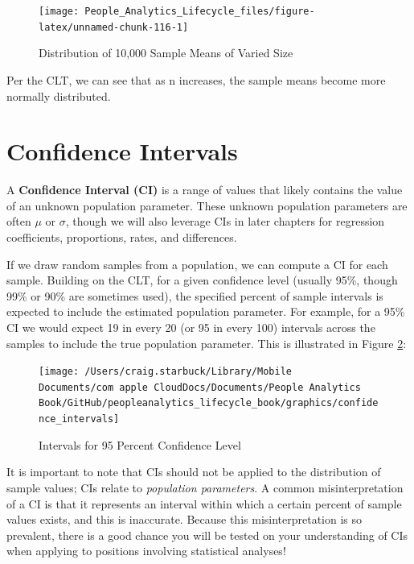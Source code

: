 \documentclass[
]{book}
\begin{document}
\begin{figure}

{\centering \texttt{[image: People\_Analytics\_Lifecycle\_files/figure-latex/unnamed-chunk-116-1]} 

}

\caption{Distribution of 10,000 Sample Means of Varied Size}\label{fig:unnamed-chunk-116}
\end{figure}

Per the CLT, we can see that as n increases, the sample means become more normally distributed.

\hypertarget{confidence-intervals}{%
\section{Confidence Intervals}\label{confidence-intervals}}

A \textbf{Confidence Interval (CI)} is a range of values that likely contains the value of an unknown population parameter. These unknown population parameters are often \(\mu\) or \(\sigma\), though we will also leverage CIs in later chapters for regression coefficients, proportions, rates, and differences.

If we draw random samples from a population, we can compute a CI for each sample. Building on the CLT, for a given confidence level (usually 95\%, though 99\% or 90\% are sometimes used), the specified percent of sample intervals is expected to include the estimated population parameter. For example, for a 95\% CI we would expect 19 in every 20 (or 95 in every 100) intervals across the samples to include the true population parameter. This is illustrated in Figure \ref{fig:conf-int}:

\begin{figure}

{\centering \texttt{[image: /Users/craig.starbuck/Library/Mobile Documents/com~apple~CloudDocs/Documents/People Analytics Book/GitHub/peopleanalytics\_lifecycle\_book/graphics/confidence\_intervals]} 

}

\caption{Intervals for 95 Percent Confidence Level}\label{fig:conf-int}
\end{figure}

It is important to note that CIs should not be applied to the distribution of sample values; CIs relate to \emph{population parameters}. A common misinterpretation of a CI is that it represents an interval within which a certain percent of sample values exists, and this is inaccurate. Because this misinterpretation is so prevalent, there is a good chance you will be tested on your understanding of CIs when applying to positions involving statistical analyses!
\end{document}
